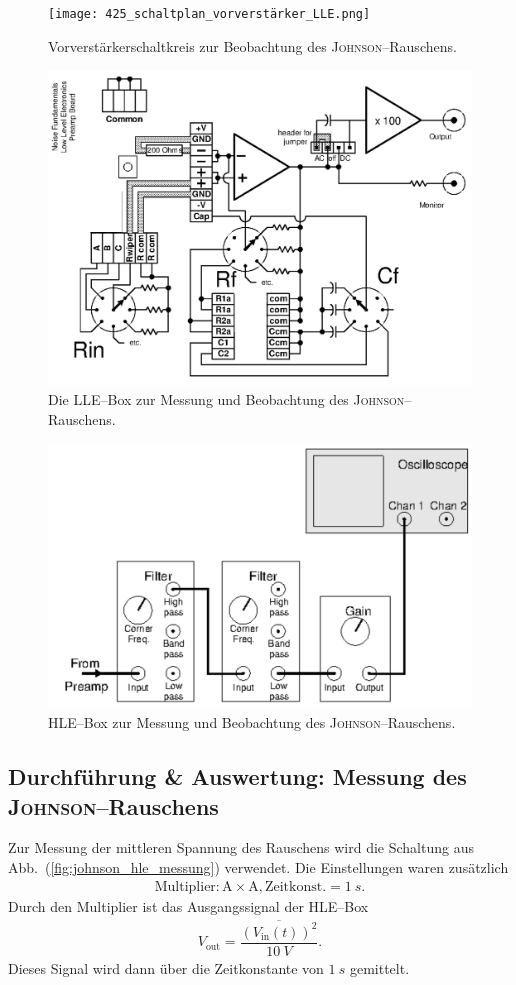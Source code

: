\documentclass[sn-mathphys-num,iicol]{sn-jnl}
\theoremstyle{thmstyleone}
\theoremstyle{thmstyletwo}
\theoremstyle{thmstylethree}
\begin{document}
\begin{figure}[t]
	\centering
	\texttt{[image: 425\_schaltplan\_vorverstärker\_LLE.png]}
	\caption{Vorverstärkerschaltkreis zur Beobachtung des \textsc{Johnson}--Rauschens.\cite{anleitung425}} \label{fig:vorverstärker}
\end{figure}

\begin{figure}[t]
	\centering
	\includegraphics[width=.5\textwidth]{425_schaltplan_johnson_LLE.png}
	\caption{Die LLE--Box zur Messung und Beobachtung des \textsc{Johnson}--Rauschens.\cite{anleitung425}} \label{fig:johnson_lle}
\end{figure}

\begin{figure}[t]
	\centering
	\includegraphics[width=.5\textwidth]{425_schaltplan_visualisierung_johnson_HLE.png}
	\caption{HLE--Box zur Messung und Beobachtung des \textsc{Johnson}--Rauschens.\cite{anleitung425}} \label{fig:johnson_hle}
\end{figure}

\subsection{Durchführung \& Auswertung: Messung des \textsc{Johnson}--Rauschens}
Zur Messung der mittleren Spannung des Rauschens wird die Schaltung aus Abb.\ (\ref{fig:johnson_hle_messung}) verwendet.
Die Einstellungen waren zusätzlich
\begin{align}
	\text{Multiplier}:\text{A}\times \text{A},\text{Zeitkonst.}=\SI{1}{s}
	.\end{align}
Durch den Multiplier ist das Ausgangssignal der HLE--Box
\begin{align}
	V_\text{out}=\dfrac{\overline{\left(V_\text{in}(t)\right)^2}}{\SI{10}{V}}
	.\end{align}
Dieses Signal wird dann über die Zeitkonstante von $\SI{1}{s}$ gemittelt.
\end{document}
